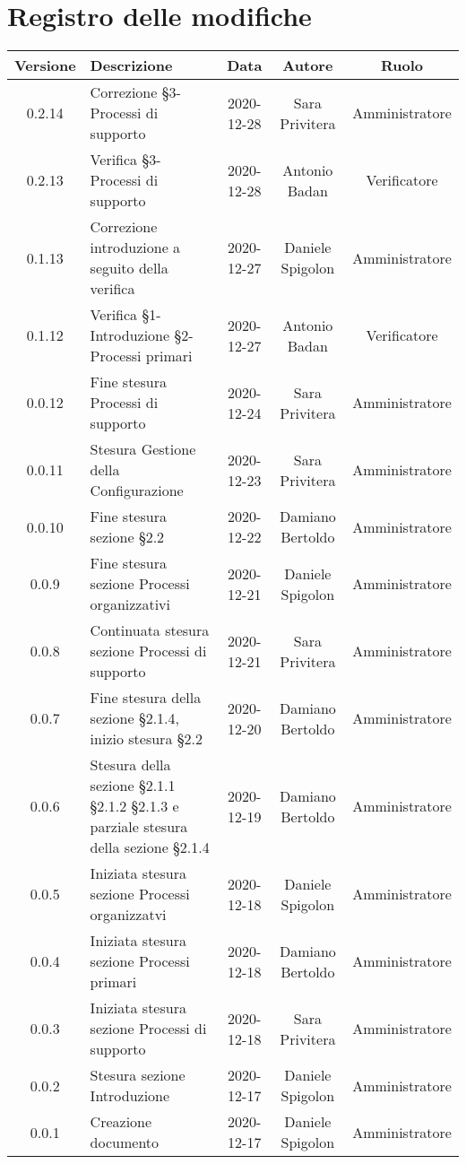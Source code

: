 \section*{Registro delle modifiche}

\begin{center}
	\begin{longtable}{|c|p{5cm}|c|c|c|}
	\hline
	\rowcolor{lighter-grayer}
	\textbf{Versione} & \textbf{Descrizione} & \textbf{Data} & \textbf{Autore} & \textbf{Ruolo} \\
	\hline
	\endfirsthead

	0.2.14 & Correzione §3-Processi di supporto  & 2020-12-28 & Sara Privitera & Amministratore \\
	\hline
	0.2.13 & Verifica §3-Processi di supporto  & 2020-12-28 & Antonio Badan & Verificatore \\
	\hline
	0.1.13 & Correzione introduzione a seguito della verifica  & 2020-12-27 & Daniele Spigolon & Amministratore \\
	\hline
	0.1.12 & Verifica §1-Introduzione §2-Processi primari  & 2020-12-27 & Antonio Badan & Verificatore \\
	\hline
	0.0.12 & Fine stesura Processi di supporto & 2020-12-24 & Sara Privitera & Amministratore \\
	\hline
	0.0.11 & Stesura Gestione della Configurazione & 2020-12-23 & Sara Privitera & Amministratore \\
	\hline
	0.0.10 & Fine stesura sezione §2.2 & 2020-12-22 & Damiano Bertoldo & Amministratore \\
	\hline
	0.0.9 & Fine stesura sezione Processi organizzativi & 2020-12-21 & Daniele Spigolon & Amministratore \\
	\hline
	0.0.8 & Continuata stesura sezione Processi di supporto & 2020-12-21 & Sara Privitera & Amministratore \\
	\hline
	0.0.7 & Fine stesura della sezione §2.1.4, inizio stesura §2.2 & 2020-12-20 & Damiano Bertoldo & Amministratore \\
	\hline
	0.0.6 & Stesura della sezione §2.1.1 §2.1.2 §2.1.3 e parziale stesura della sezione §2.1.4 & 2020-12-19 & Damiano Bertoldo & Amministratore \\
	\hline
	0.0.5 & Iniziata stesura sezione Processi organizzatvi & 2020-12-18 & Daniele Spigolon & Amministratore \\
	\hline
	0.0.4 & Iniziata stesura sezione Processi primari & 2020-12-18 & Damiano Bertoldo & Amministratore \\
	\hline
	0.0.3 & Iniziata stesura sezione Processi di supporto & 2020-12-18 & Sara Privitera & Amministratore \\
	\hline
	0.0.2 & Stesura sezione Introduzione & 2020-12-17 & Daniele Spigolon & Amministratore \\
	\hline
	0.0.1 & Creazione documento & 2020-12-17 & Daniele Spigolon & Amministratore \\
	\hline
	
	

	\end{longtable}
\end{center}
